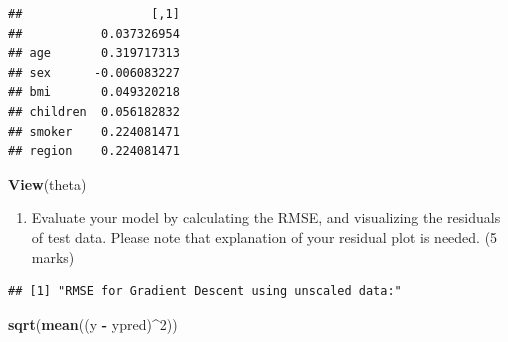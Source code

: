 \documentclass[
]{article}
\newenvironment{Shaded}{\begin{snugshade}}{\end{snugshade}}
\newcommand{\CommentTok}[1]{\textcolor[rgb]{0.56,0.35,0.01}{\textit{#1}}}
\newcommand{\ControlFlowTok}[1]{\textcolor[rgb]{0.13,0.29,0.53}{\textbf{#1}}}
\newcommand{\DecValTok}[1]{\textcolor[rgb]{0.00,0.00,0.81}{#1}}
\newcommand{\KeywordTok}[1]{\textcolor[rgb]{0.13,0.29,0.53}{\textbf{#1}}}
\newcommand{\NormalTok}[1]{#1}
\newcommand{\OperatorTok}[1]{\textcolor[rgb]{0.81,0.36,0.00}{\textbf{#1}}}
\newcommand{\StringTok}[1]{\textcolor[rgb]{0.31,0.60,0.02}{#1}}
\providecommand{\tightlist}{%
  \setlength{\itemsep}{0pt}\setlength{\parskip}{0pt}}
\begin{document}
\begin{verbatim}
##                  [,1]
##           0.037326954
## age       0.319717313
## sex      -0.006083227
## bmi       0.049320218
## children  0.056182832
## smoker    0.224081471
## region    0.224081471
\end{verbatim}

\begin{Shaded}
\begin{Highlighting}[]
\KeywordTok{View}\NormalTok{(theta)}
\end{Highlighting}
\end{Shaded}

\begin{enumerate}
\def\labelenumi{\arabic{enumi}.}
\setcounter{enumi}{3}
\tightlist
\item
  Evaluate your model by calculating the RMSE, and visualizing the
  residuals of test data. Please note that explanation of your residual
  plot is needed. (5 marks)
\end{enumerate}

\begin{Shaded}
\end{Shaded}

\begin{verbatim}
## [1] "RMSE for Gradient Descent using unscaled data:"
\end{verbatim}

\begin{Shaded}
\begin{Highlighting}[]
\KeywordTok{sqrt}\NormalTok{(}\KeywordTok{mean}\NormalTok{((y }\OperatorTok{-}\StringTok{ }\NormalTok{ypred)}\OperatorTok{^}\DecValTok{2}\NormalTok{))}
\end{Highlighting}
\end{Shaded}
\end{document}
